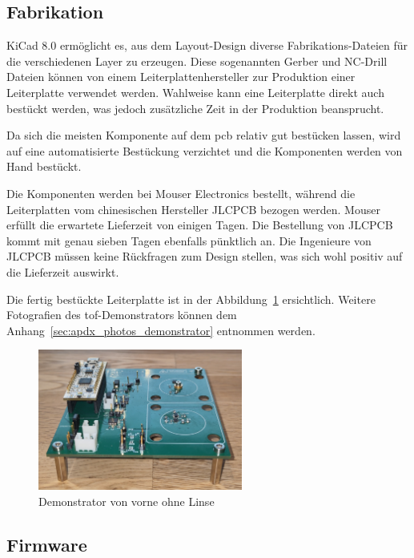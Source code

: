 \subsection{Fabrikation}
KiCad 8.0 ermöglicht es, aus dem Layout-Design diverse Fabrikations-Dateien für die verschiedenen Layer zu erzeugen.
Diese sogenannten Gerber und NC-Drill Dateien können von einem Leiterplattenhersteller zur Produktion einer Leiterplatte
verwendet werden. Wahlweise kann eine Leiterplatte direkt auch bestückt werden, was jedoch zusätzliche Zeit in der Produktion
beansprucht.

Da sich die meisten Komponente auf dem \acrshort{pcb} relativ gut bestücken lassen, wird auf eine automatisierte Bestückung
verzichtet und die Komponenten werden von Hand bestückt.

Die Komponenten werden bei Mouser Electronics bestellt, während die Leiterplatten vom chinesischen Hersteller JLCPCB
\cite{jlc2025jlcpcb} bezogen werden. Mouser erfüllt die erwartete Lieferzeit von einigen Tagen. Die Bestellung von
JLCPCB kommt mit genau sieben Tagen ebenfalls pünktlich an. Die Ingenieure von JLCPCB müssen keine Rückfragen zum Design
stellen, was sich wohl positiv auf die Lieferzeit auswirkt.

Die fertig bestückte Leiterplatte ist in der Abbildung~\ref{fig:photo_demonstrator_front_wo_lens} ersichtlich. Weitere
Fotografien des \acrshort{tof}-Demonstrators können dem Anhang~\ref{sec:apdx_photos_demonstrator} entnommen werden.

\begin{figure}[H]
    \centering
    \includegraphics[width=0.6\textwidth]{graphics/photo_demonstrator_front_wo_lens.jpg}
    \caption{Demonstrator von vorne ohne Linse}\label{fig:photo_demonstrator_front_wo_lens}
\end{figure}

\subsection{Firmware}

